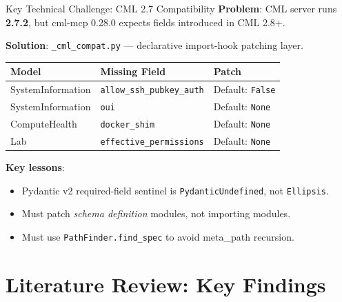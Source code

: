 \documentclass[11pt,aspectratio=169]{beamer}
\begin{document}
\begin{frame}{Key Technical Challenge: CML 2.7 Compatibility}
  \textbf{Problem}: CML server runs \textbf{2.7.2}, but cml-mcp 0.28.0
  expects fields introduced in CML 2.8+.

  \vspace{4pt}
  \textbf{Solution}: \texttt{\_cml\_compat.py} --- declarative import-hook
  patching layer.

  \vspace{6pt}
  \begin{table}
    \footnotesize
    \begin{tabular}{llp{4.5cm}}
      \toprule
      \textbf{Model} & \textbf{Missing Field} & \textbf{Patch} \\
      \midrule
      SystemInformation & \texttt{allow\_ssh\_pubkey\_auth} & Default: \texttt{False} \\
      SystemInformation & \texttt{oui}                    & Default: \texttt{None} \\
      ComputeHealth     & \texttt{docker\_shim}            & Default: \texttt{None} \\
      Lab               & \texttt{effective\_permissions}  & Default: \texttt{None} \\
      \bottomrule
    \end{tabular}
  \end{table}

  \vspace{4pt}
  \textbf{Key lessons}:
  \begin{itemize}
    \item Pydantic v2 required-field sentinel is \texttt{PydanticUndefined}, not \texttt{Ellipsis}.
    \item Must patch \emph{schema definition} modules, not importing modules.
    \item Must use \texttt{PathFinder.find\_spec} to avoid meta\_path recursion.
  \end{itemize}
\end{frame}

\section{Literature Review: Key Findings}
\end{document}
